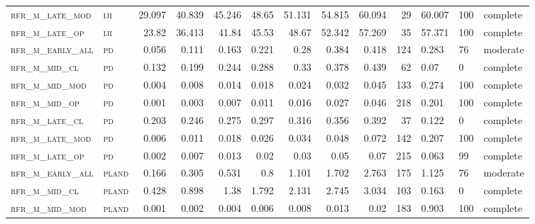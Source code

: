\begin{landscape}
\begin{center}
\begin{longtable}{llrrrrr|rrr}
\textsc{rfr\_m\_late\_mod } & \textsc{iji       }   & 29.097  & 40.839  & 45.246  & 48.65    & 51.131   & 54.815   & 60.094   & 29     & 60.007        & 100           & complete       \\
\textsc{rfr\_m\_late\_op  } & \textsc{iji       }   & 23.82   & 36.413  & 41.84   & 45.53    & 48.67    & 52.342   & 57.269   & 35     & 57.371        & 100           & complete       \\
\textsc{rfr\_m\_early\_all} & \textsc{pd        }   & 0.056   & 0.111   & 0.163   & 0.221    & 0.28     & 0.384    & 0.418    & 124    & 0.283         & 76            & moderate       \\
\textsc{rfr\_m\_mid\_cl   } & \textsc{pd        }   & 0.132   & 0.199   & 0.244   & 0.288    & 0.33     & 0.378    & 0.439    & 62     & 0.07          & 0             & complete           \\
\textsc{rfr\_m\_mid\_mod  } & \textsc{pd        }   & 0.004   & 0.008   & 0.014   & 0.018    & 0.024    & 0.032    & 0.045    & 133    & 0.274         & 100           & complete       \\
\textsc{rfr\_m\_mid\_op   } & \textsc{pd        }   & 0.001   & 0.003   & 0.007   & 0.011    & 0.016    & 0.027    & 0.046    & 218    & 0.201         & 100           & complete       \\
\textsc{rfr\_m\_late\_cl  } & \textsc{pd        }   & 0.203   & 0.246   & 0.275   & 0.297    & 0.316    & 0.356    & 0.392    & 37     & 0.122         & 0             & complete           \\
\textsc{rfr\_m\_late\_mod } & \textsc{pd        }   & 0.006   & 0.011   & 0.018   & 0.026    & 0.034    & 0.048    & 0.072    & 142    & 0.207         & 100           & complete       \\
\textsc{rfr\_m\_late\_op  } & \textsc{pd        }   & 0.002   & 0.007   & 0.013   & 0.02     & 0.03     & 0.05     & 0.07     & 215    & 0.063         & 99            & complete       \\
\textsc{rfr\_m\_early\_all} & \textsc{pland     }   & 0.166   & 0.305   & 0.531   & 0.8      & 1.101    & 1.702    & 2.763    & 175    & 1.125         & 76            & moderate       \\
\textsc{rfr\_m\_mid\_cl   } & \textsc{pland     }   & 0.428   & 0.898   & 1.38    & 1.792    & 2.131    & 2.745    & 3.034    & 103    & 0.163         & 0             & complete           \\
\textsc{rfr\_m\_mid\_mod  } & \textsc{pland     }   & 0.001   & 0.002   & 0.004   & 0.006    & 0.008    & 0.013    & 0.02     & 183    & 0.903         & 100           & complete       \\

\end{longtable}
\end{center}
\end{landscape}
